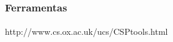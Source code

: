 ~\cite{Schneider:1999:CRT:555233}

\subsubsection{Ferramentas}
\paragraph{}
http://www.cs.ox.ac.uk/ucs/CSPtools.html
